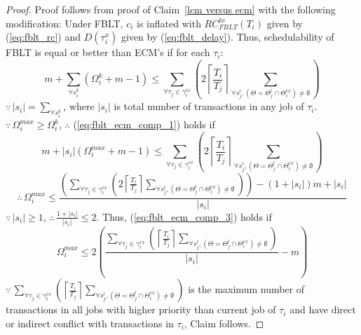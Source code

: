 \begin{proof}
%
Proof follows from proof of Claim~\ref{lcm versus ecm} with the following modification: Under FBLT, $c_i$ is inflated with $RC_{FBLT}^{to}(T_i)$ given by (\ref{eq:fblt_rc}) and $D(\tau_i^x)$ given by (\ref{eq:fblt_delay}). Thus, schedulability of FBLT is equal or better than ECM's if for each $\tau_i$:
%
\begin{equation}
m+\sum_{\forall s_{i}^{k}}\left(\Omega_{i}^{k}+m-1\right)\le\sum_{\forall\tau_{j}\in\gamma_{i}^{ex}}\left(2\left\lceil \frac{T_{i}}{T_{j}}\right\rceil \sum_{\forall s_{j}^{l},\left(\Theta=\Theta_{j}^{l}\cap\Theta_{i}^{ex}\right)\neq\emptyset}\right)\label{eq:fblt_ecm_comp_1}
\end{equation}
%
$\because\,|s_{i}|=\sum_{\forall s_{i}^{k}}$, where $|s_{i}|$ is
total number of transactions in any job of $\tau_{i}$. $\because \, \Omega_i^{max} \ge \Omega_i^k$, $\therefore$ (\ref{eq:fblt_ecm_comp_1}) holds if 
% 
\begin{equation}
m+|s_{i}|\left(\Omega_{i}^{max}+m-1\right)\le\sum_{\forall\tau_{j}\in\gamma_{i}^{ex}}\left(2\left\lceil \frac{T_{i}}{T_{j}}\right\rceil \sum_{\forall s_{j}^{l},\left(\Theta=\Theta_{j}^{l}\cap\Theta_{i}^{ex}\right)\neq\emptyset}\right)\label{eq:fblt_ecm_comp_2}
\end{equation}
%
\begin{equation}
\therefore\, \Omega_{i}^{max}\le\frac{\left(\sum_{\forall\tau_{j}\in\gamma_{i}^{ex}}\left(2\left\lceil \frac{T_{i}}{T_{j}}\right\rceil \sum_{\forall s_{j}^{l},\left(\Theta=\Theta_{j}^{l}\cap\Theta_{i}^{ex}\right)\neq\emptyset}\right)\right)-\left(1+|s_{i}|\right)m+|s_{i}|}{|s_{i}|}\label{eq:fblt_ecm_comp_3}
\end{equation}
%
$\because\,|s_{i}|\ge1$, $\therefore\,\frac{1+|s_{i}|}{|s_{i}|}\le2$.
Thus, (\ref{eq:fblt_ecm_comp_3}) holds if 
\begin{equation}
\Omega_{i}^{max}\le2\left(\frac{\sum_{\forall\tau_{j}\in\gamma_{i}^{ex}}\left(\left\lceil \frac{T_{i}}{T_{j}}\right\rceil \sum_{\forall s_{j}^{l},\left(\Theta=\Theta_{j}^{l}\cap\Theta_{i}^{ex}\right)\neq\emptyset}\right)}{|s_{i}|}-m\right)
\label{eq:fblt_ecm_comp_4}
\end{equation}
%
$\because\,\sum_{\forall\tau_{j}\in\gamma_{i}^{ex}}\left(\left\lceil \frac{T_{i}}{T_{j}}\right\rceil \sum_{\forall s_{j}^{l},\left(\Theta=\Theta_{j}^{l}\cap\Theta_{i}^{ex}\right)\neq\emptyset}\right)$
is the maximum number of transactions in all jobs with higher priority
than current job of $\tau_{i}$ and have direct or indirect conflict
with transactions in $\tau_{i}$, Claim follows.
%
\end{proof}
%
